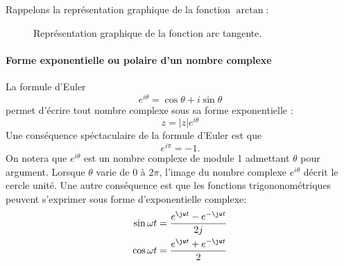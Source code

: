 Rappelons la représentation graphique de la fonction $\arctan$:

\begin{figure}[!ht]
    \centering
{}
    \caption{Représentation graphique de la fonction arc tangente.\label{fig-arctangente}}
\end{figure}


\paragraph{Forme exponentielle ou polaire d'un nombre complexe}
La formule d'Euler 
$$
e^{i\theta}=\cos\theta+i\sin\theta
$$
permet d'écrire tout nombre complexe sous sa forme exponentielle : 
$$
z=|z|e^{i\theta}
$$
Une conséquence spéctaculaire de la formule d'Euler est que
$$
e^{i\pi}=-1.
$$
On notera que $e^{i\theta}$ est un nombre complexe de module 1 admettant $\theta$ pour argument.
Lorsque $\theta$ varie de $0$ à $2\pi$, l'image du nombre complexe $e^{i\theta}$ décrit 
le cercle unité.
Une autre conséquence est que les fonctions trigononométriques peuvent s'exprimer sous forme d'exponentielle 
complexe:
\begin{align*}
    \sin{\omega t}&=\dfrac{e^{\jw t}-e^{-\jw t}}{2j} \\
    \cos{\omega t}&=\dfrac{e^{\jw t}+e^{-\jw t}}{2}
\end{align*}

